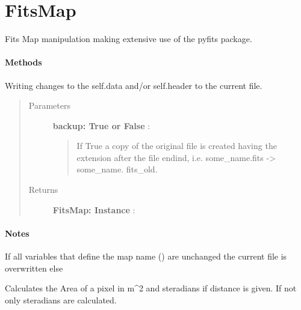 \documentclass[a4paper,10pt,english]{sphinxmanual}
\begin{document}
\section{FitsMap}
\label{maps:fitsmap}

\begin{fulllineitems}
\label{maps:astrolyze.maps.fits.FitsMap}
Fits Map manipulation making extensive use of the
pyfits package.
\paragraph{Methods}

\begin{fulllineitems}
\label{maps:astrolyze.maps.fits.FitsMap.update_file}
Writing changes to the self.data and/or self.header to the current
file.
\begin{quote}\begin{description}
\item[{Parameters }] \leavevmode
\textbf{backup: True or False} :
\begin{quote}

If True a copy of the original file is created having the extension
 after the file endind, i.e. some\_name.fits -\textgreater{} some\_name.
fits\_old.
\end{quote}

\item[{Returns }] \leavevmode
\textbf{FitsMap: Instance} :

\end{description}\end{quote}
\paragraph{Notes}

If all variables that define the map name () are unchanged the current
file is overwritten else

\end{fulllineitems}


\begin{fulllineitems}
\label{maps:astrolyze.maps.fits.FitsMap.get_pixel_size}
Calculates the Area of a pixel in m\textasciicircum{}2 and steradians if distance
is given. If not only  steradians are calculated.


\end{fulllineitems}
\end{fulllineitems}
\end{document}

